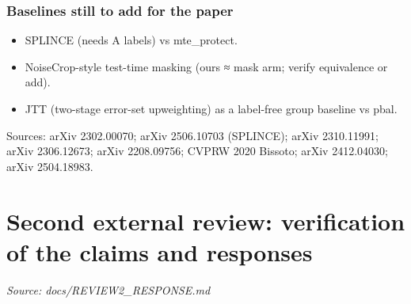 {\subsubsection{Baselines still to add for the paper}\label{baselines-still-to-add-for-the-paper}

\begin{itemize}

\item
  SPLINCE (needs A labels) vs mte\_protect.
\item
  NoiseCrop-style test-time masking (ours ≈ mask arm; verify equivalence or add).
\item
  JTT (two-stage error-set upweighting) as a label-free group baseline vs pbal.
\end{itemize}

Sources: arXiv 2302.00070; arXiv 2506.10703 (SPLINCE); arXiv 2310.11991; arXiv 2306.12673; arXiv 2208.09756;
CVPRW 2020 Bissoto; arXiv 2412.04030; arXiv 2504.18983.

}

\section{Second external review: verification of the claims and responses}\label{doc:REVIEW2_RESPONSE}
\noindent\textit{Source: docs/REVIEW2\_RESPONSE.md}

